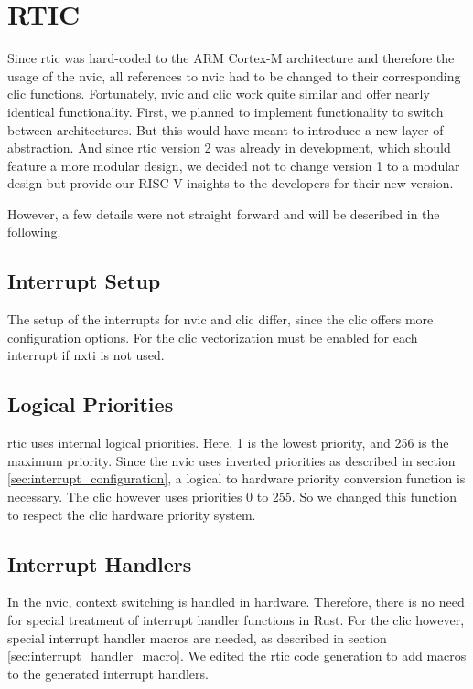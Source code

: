 \section{RTIC}
\label{sec:rtic_port}
Since \gls{rtic} was hard-coded to the ARM Cortex-M architecture and therefore the usage of the \gls{nvic}, all references to \gls{nvic} had to be changed to their corresponding \gls{clic} functions. Fortunately, \gls{nvic} and \gls{clic} work quite similar and offer nearly identical functionality. First, we planned to implement functionality to switch between architectures. But this would have meant to introduce a new layer of abstraction. And since \gls{rtic} version 2 was already in development, which should feature a more modular design, we decided not to change version 1 to a modular design but provide our RISC-V insights to the developers for their new version.

However, a few details were not straight forward and will be described in the following.

\subsection{Interrupt Setup}
The setup of the interrupts for \gls{nvic} and \gls{clic} differ, since the \gls{clic} offers more configuration options. For the \gls{clic} vectorization must be enabled for each interrupt if nxti is not used. 

\subsection{Logical Priorities}
\gls{rtic} uses internal logical priorities. Here, 1 is the lowest priority, and 256 is the maximum priority. Since the \gls{nvic} uses inverted priorities as described in section \ref{sec:interrupt_configuration}, a logical to hardware priority conversion function is necessary. The \gls{clic} however uses priorities 0 to 255. So we changed this function to respect the \gls{clic} hardware priority system.

\subsection{Interrupt Handlers}
In the \gls{nvic}, context switching is handled in hardware. Therefore, there is no need for special treatment of interrupt handler functions in Rust. For the \gls{clic} however, special interrupt handler macros are needed, as described in section \ref{sec:interrupt_handler_macro}. We edited the \gls{rtic} code generation to add macros to the generated interrupt handlers.

